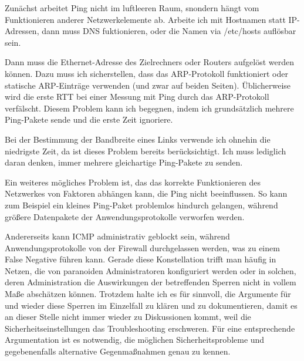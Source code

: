 \begin{normaltext}
  Zunächst arbeitet Ping nicht im luftleeren Raum, snondern hängt vom
  Funktionieren anderer Netzwerkelemente ab. Arbeite ich mit Hostnamen statt
  IP-Adressen, dann muss DNS fuktionieren, oder die Namen via /etc/hosts
  auflösbar sein.

  Dann muss die Ethernet-Adresse des Zielrechners oder Routers aufgelöst
  werden können. Dazu muss ich sicherstellen, dass das ARP-Protokoll
  funktioniert oder statische ARP-Einträge verwenden (und zwar auf beiden
  Seiten). Üblicherweise wird die erste RTT bei einer Messung mit Ping durch
  das ARP-Protokoll verfälscht. Diesem Problem kann ich begegnen, indem ich
  grundsätzlich mehrere Ping-Pakete sende und die erste Zeit ignoriere.

  Bei der Bestimmung der Bandbreite eines Links verwende ich ohnehin die
  niedrigste Zeit, da ist dieses Problem bereits berücksichtigt. Ich muss
  lediglich daran denken, immer mehrere gleichartige Ping-Pakete zu senden.

  Ein weiteres mögliches Problem ist, das das korrekte Funktionieren des
  Netzwerkes von Faktoren abhängen kann, die Ping nicht beeinflussen. So kann
  zum Beispiel ein kleines Ping-Paket problemlos hindurch gelangen, während
  größere Datenpakete der Anwendungsprotokolle verworfen werden.

  Andererseits kann ICMP administrativ geblockt sein, während
  Anwendungsprotokolle von der Firewall durchgelassen werden, was zu einem
  False Negative führen kann. Gerade diese Konstellation trifft man häufig in
  Netzen, die von paranoiden Administratoren konfiguriert werden oder in
  solchen, deren Administration die Auswirkungen der betreffenden Sperren
  nicht in vollem Maße abschätzen können. Trotzdem halte ich es für sinnvoll,
  die Argumente für und wieder diese Sperren im Einzelfall zu klären und zu
  dokumentieren, damit es an dieser Stelle nicht immer wieder zu Diskussionen
  kommt, weil die Sicherheitseinstellungen das Troubleshooting erschweren. Für
  eine entsprechende Argumentation ist es notwendig, die möglichen
  Sicherheitsprobleme und gegebenenfalls alternative Gegenmaßnahmen genau zu
  kennen.


\end{normaltext}
